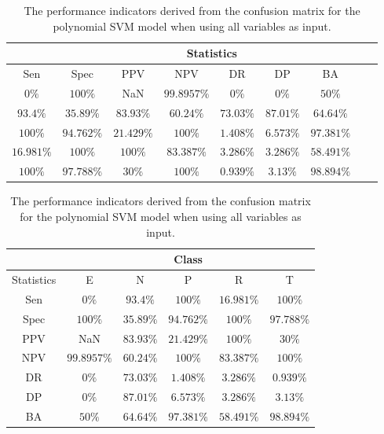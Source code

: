 \begin{table}[!ht]
	\centering
	\begin{tabular}{|c|c|c|c|c|c|c|c|c|}
		\hline
		 & \multicolumn{7}{c|}{Statistics} \\ \hline
		Sen & Spec & PPV & NPV & DR & DP & BA \\ \hline
		$0\%$ & $100\%$ & NaN & $99.8957\%$ & $0\%$ & $0\%$ & $50\%$ \\ \hline
		$93.4\%$ & $35.89\%$ & $83.93\%$ & $60.24\%$ & $73.03\%$ & $87.01\%$ & $64.64\%$ \\ \hline
		$100\%$ & $94.762\%$ & $21.429\%$ & $100\%$ & $1.408\%$ & $6.573\%$ & $97.381\%$ \\ \hline
		$16.981\%$ & $100\%$ & $100\%$ & $83.387\%$ & $3.286\%$ & $3.286\%$ & $58.491\%$ \\ \hline
		$100\%$ & $97.788\%$ & $30\%$ & $100\%$ & $0.939\%$ & $3.13\%$ & $98.894\%$ \\ \hline
	\end{tabular}
	\caption{The performance indicators derived from the confusion matrix for the polynomial SVM model when using all variables as input.}
	\label{tab:cs:all:svmPoly}
\end{table}

\begin{table}[!ht]
	\centering
	\begin{tabular}{|c|c|c|c|c|c|}
		\hline
		 & \multicolumn{5}{c|}{Class} \\ \hline
		Statistics & E & N & P & R & T \\ \hline
		Sen & $0\%$ & $93.4\%$ & $100\%$ & $16.981\%$ & $100\%$ \\ \hline
		Spec & $100\%$ & $35.89\%$ & $94.762\%$ & $100\%$ & $97.788\%$ \\ \hline
		PPV & NaN & $83.93\%$ & $21.429\%$ & $100\%$ & $30\%$ \\ \hline
		NPV & $99.8957\%$ & $60.24\%$ & $100\%$ & $83.387\%$ & $100\%$ \\ \hline
		DR & $0\%$ & $73.03\%$ & $1.408\%$ & $3.286\%$ & $0.939\%$ \\ \hline
		DP & $0\%$ & $87.01\%$ & $6.573\%$ & $3.286\%$ & $3.13\%$ \\ \hline
		BA & $50\%$ & $64.64\%$ & $97.381\%$ & $58.491\%$ & $98.894\%$ \\ \hline
	\end{tabular}
	\caption{The performance indicators derived from the confusion matrix for the polynomial SVM model when using all variables as input.}
	\label{tab:cs:reverse:all:svmPoly}
\end{table}
